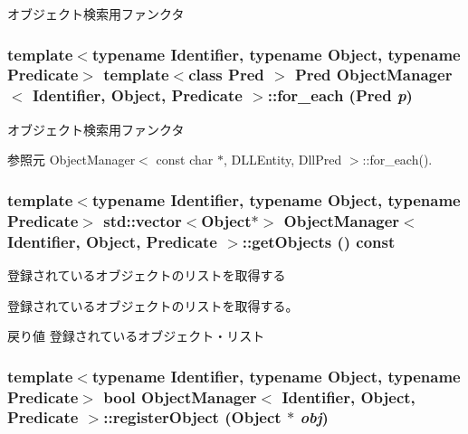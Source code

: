 オブジェクト検索用ファンクタ 

\subsubsection[{for\_\-each}]{\setlength{\rightskip}{0pt plus 5cm}template$<$typename Identifier, typename Object, typename Predicate$>$ template$<$class Pred $>$ Pred {\bf ObjectManager}$<$ Identifier, Object, Predicate $>$::for\_\-each (Pred {\em p})\hspace{0.3cm}{\ttfamily  [inline]}}\label{classObjectManager_a179e86f4b3548f17ac88ac2e2679d541}


オブジェクト検索用ファンクタ 



参照元 ObjectManager$<$ const char $\ast$, DLLEntity, DllPred $>$::for\_\-each().

\subsubsection[{getObjects}]{\setlength{\rightskip}{0pt plus 5cm}template$<$typename Identifier, typename Object, typename Predicate$>$ std::vector$<$Object$\ast$$>$ {\bf ObjectManager}$<$ Identifier, Object, Predicate $>$::getObjects () const\hspace{0.3cm}{\ttfamily  [inline]}}\label{classObjectManager_ab60972d0240a0a1098ed5cec63f0fca2}


登録されているオブジェクトのリストを取得する 

登録されているオブジェクトのリストを取得する。

\begin{DoxyReturn}{戻り値}
登録されているオブジェクト・リスト 
\end{DoxyReturn}
\subsubsection[{registerObject}]{\setlength{\rightskip}{0pt plus 5cm}template$<$typename Identifier, typename Object, typename Predicate$>$ bool {\bf ObjectManager}$<$ Identifier, Object, Predicate $>$::registerObject (Object $\ast$ {\em obj})\hspace{0.3cm}{\ttfamily  [inline]}}\label{classObjectManager_a43de06b277f07a24088b46f640de8221}


